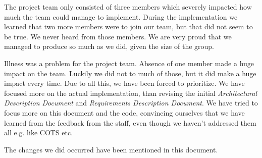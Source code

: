 The project team only consisted of three members which severely impacted how much the team could manage to implement. During the implementation we learned that two more members were to join our team, but that did not seem to be true. We never heard from those members. We are very proud that we managed to produce so much as we did, given the size of the group.  

Illness was a problem for the project team. Absence of one member made a huge impact on the team. Luckily we did not to much of those, but it did make a huge impact every time. Due to all this, we have been forced to prioritize. We have focused more on the actual implementation, than revising the initial \emph{Architectural Description Document} and \emph{Requirements Description Document}. We have tried to focus more on this document and the code, convincing ourselves that we have learned from the feedback from the staff, even though we haven't addressed them all e.g. like COTS etc.   

The changes we did occurred have been mentioned in this document. 


 
